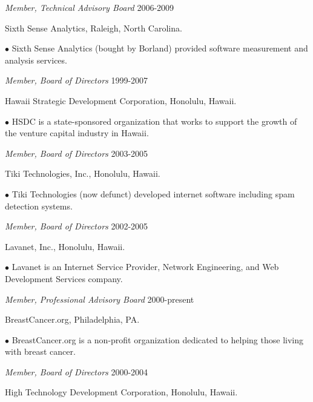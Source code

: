 \begin{Industry Experience}

\item {\em Member, Technical Advisory Board} \hfill 2006-2009
\vspace*{-10pt}
\item Sixth Sense Analytics, Raleigh, North Carolina.

  $\bullet$ Sixth Sense Analytics (bought by Borland) provided software measurement
and analysis services. 

\item {\em Member, Board of Directors} \hfill 1999-2007
\vspace*{-10pt}
\item Hawaii Strategic Development Corporation, Honolulu, Hawaii.

  $\bullet$ HSDC is a state-sponsored organization that works
to support the growth of the venture capital industry in Hawaii.

\item {\em Member, Board of Directors} \hfill 2003-2005
\vspace*{-10pt}
\item Tiki Technologies, Inc., Honolulu, Hawaii.

  $\bullet$ Tiki Technologies (now defunct) developed internet software including
spam detection systems. 

\item {\em Member, Board of Directors} \hfill 2002-2005
\vspace*{-10pt}
\item Lavanet, Inc., Honolulu, Hawaii.

  $\bullet$ Lavanet is an Internet Service Provider, 
Network Engineering, and Web Development Services company.


\item {\em Member, Professional Advisory Board} \hfill 2000-present
\vspace*{-10pt}
\item BreastCancer.org, Philadelphia, PA.

  $\bullet$ BreastCancer.org is a non-profit organization dedicated 
  to helping those living with breast cancer. 

\item {\em Member, Board of Directors} \hfill 2000-2004
\vspace*{-10pt}
\item High Technology Development Corporation, Honolulu, Hawaii.


\end{Industry Experience}
